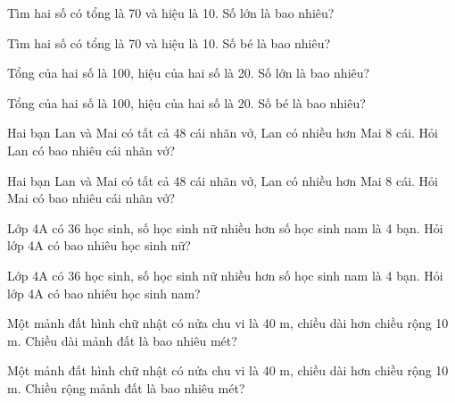 \begin{ex}
Tìm hai số có tổng là 70 và hiệu là 10. Số lớn là bao nhiêu?
\end{ex}

\begin{ex}
Tìm hai số có tổng là 70 và hiệu là 10. Số bé là bao nhiêu?
\end{ex}

\begin{ex}
Tổng của hai số là 100, hiệu của hai số là 20. Số lớn là bao nhiêu?
\end{ex}

\begin{ex}
Tổng của hai số là 100, hiệu của hai số là 20. Số bé là bao nhiêu?
\end{ex}

\begin{ex}
Hai bạn Lan và Mai có tất cả 48 cái nhãn vở, Lan có nhiều hơn Mai 8 cái. Hỏi Lan có bao nhiêu cái nhãn vở?
\end{ex}

\begin{ex}
Hai bạn Lan và Mai có tất cả 48 cái nhãn vở, Lan có nhiều hơn Mai 8 cái. Hỏi Mai có bao nhiêu cái nhãn vở?
\end{ex}

\begin{ex}
Lớp 4A có 36 học sinh, số học sinh nữ nhiều hơn số học sinh nam là 4 bạn. Hỏi lớp 4A có bao nhiêu học sinh nữ?
\end{ex}

\begin{ex}
Lớp 4A có 36 học sinh, số học sinh nữ nhiều hơn số học sinh nam là 4 bạn. Hỏi lớp 4A có bao nhiêu học sinh nam?
\end{ex}

\begin{ex}
Một mảnh đất hình chữ nhật có nửa chu vi là 40 m, chiều dài hơn chiều rộng 10 m. Chiều dài mảnh đất là bao nhiêu mét?
\end{ex}

\begin{ex}
Một mảnh đất hình chữ nhật có nửa chu vi là 40 m, chiều dài hơn chiều rộng 10 m. Chiều rộng mảnh đất là bao nhiêu mét?
\end{ex}

